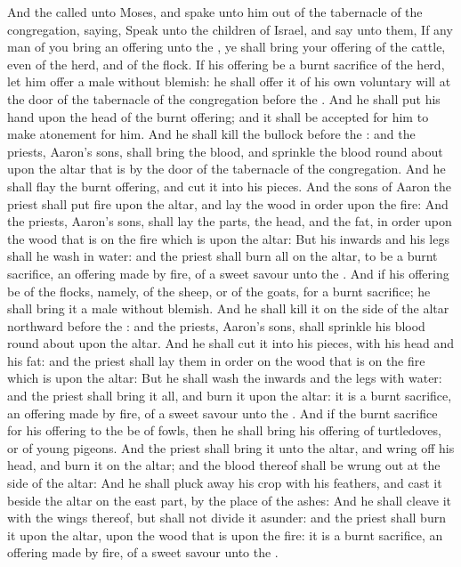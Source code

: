 
\begin{biblechapter} %
 And the \LORD called unto Moses, and spake unto him out of the tabernacle of the congregation, saying,
\verse Speak unto the children of Israel, and say unto them, If any man of you bring an offering unto the \LORD, ye shall bring your offering of the cattle, even of the herd, and of the flock.
\verse If his offering be a burnt sacrifice of the herd, let him offer a male without blemish: he shall offer it of his own voluntary will at the door of the tabernacle of the congregation before the \LORD.
\verse And he shall put his hand upon the head of the burnt offering; and it shall be accepted for him to make atonement for him.
\verse And he shall kill the bullock before the \LORD: and the priests, Aaron's sons, shall bring the blood, and sprinkle the blood round about upon the altar that is by the door of the tabernacle of the congregation.
\verse And he shall flay the burnt offering, and cut it into his pieces.
\verse And the sons of Aaron the priest shall put fire upon the altar, and lay the wood in order upon the fire:
\verse And the priests, Aaron's sons, shall lay the parts, the head, and the fat, in order upon the wood that is on the fire which is upon the altar:
\verse But his inwards and his legs shall he wash in water: and the priest shall burn all on the altar, to be a burnt sacrifice, an offering made by fire, of a sweet savour unto the \LORD.
\verse And if his offering be of the flocks, namely, of the sheep, or of the goats, for a burnt sacrifice; he shall bring it a male without blemish.
\verse And he shall kill it on the side of the altar northward before the \LORD: and the priests, Aaron's sons, shall sprinkle his blood round about upon the altar.
\verse And he shall cut it into his pieces, with his head and his fat: and the priest shall lay them in order on the wood that is on the fire which is upon the altar:
\verse But he shall wash the inwards and the legs with water: and the priest shall bring it all, and burn it upon the altar: it is a burnt sacrifice, an offering made by fire, of a sweet savour unto the \LORD.
\verse And if the burnt sacrifice for his offering to the \LORD be of fowls, then he shall bring his offering of turtledoves, or of young pigeons.
\verse And the priest shall bring it unto the altar, and wring off his head, and burn it on the altar; and the blood thereof shall be wrung out at the side of the altar:
\verse And he shall pluck away his crop with his feathers, and cast it beside the altar on the east part, by the place of the ashes:
\verse And he shall cleave it with the wings thereof, but shall not divide it asunder: and the priest shall burn it upon the altar, upon the wood that is upon the fire: it is a burnt sacrifice, an offering made by fire, of a sweet savour unto the \LORD.
\end{biblechapter}

